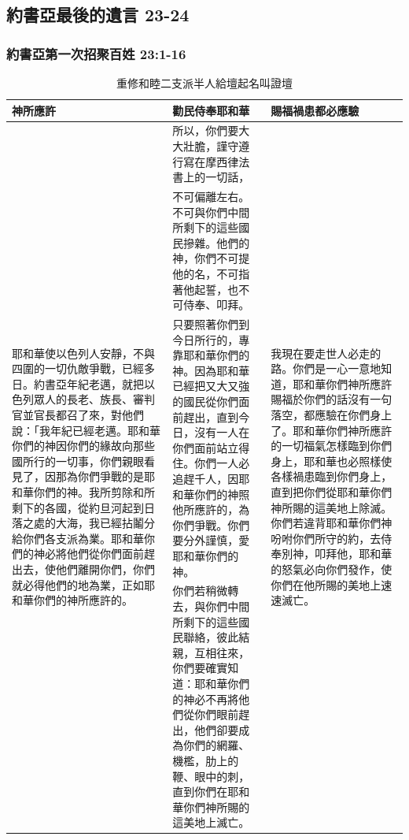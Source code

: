 \subsection{約書亞最後的遺言 23-24}
\subsubsection{約書亞第一次招聚百姓 23:1-16}
\begin{table}[H]
\centering
\begin{tabular}{p{}|p{7.75cm}|p{4.25cm}}\hline\hline
神所應許&勸民侍奉耶和華&賜福禍患都必應驗\\\hline
\multirow{4}{5.cm}{耶和華使以色列人安靜，不與四圍的一切仇敵爭戰，已經多日。約書亞年紀老邁，就把以色列眾人的長老、族長、審判官並官長都召了來，對他們說：「我年紀已經老邁。耶和華你們的神因你們的緣故向那些國所行的一切事，你們親眼看見了，因那為你們爭戰的是耶和華你們的神。我所剪除和所剩下的各國，從約旦河起到日落之處的大海，我已經拈鬮分給你們各支派為業。耶和華你們的神必將他們從你們面前趕出去，使他們離開你們，你們就必得他們的地為業，正如耶和華你們的神所應許的。}
&所以，你們要大大壯膽，謹守遵行寫在摩西律法書上的一切話，
&\multirow{4}{4.25cm}{我現在要走世人必走的路。你們是一心一意地知道，耶和華你們神所應許賜福於你們的話沒有一句落空，都應驗在你們身上了。耶和華你們神所應許的一切福氣怎樣臨到你們身上，耶和華也必照樣使各樣禍患臨到你們身上，直到把你們從耶和華你們神所賜的這美地上除滅。你們若違背耶和華你們神吩咐你們所守的約，去侍奉別神，叩拜他，耶和華的怒氣必向你們發作，使你們在他所賜的美地上速速滅亡。}\\\cline{2-2}
&不可偏離左右。不可與你們中間所剩下的這些國民摻雜。他們的神，你們不可提他的名，不可指著他起誓，也不可侍奉、叩拜。&\\\cline{2-2}
&只要照著你們到今日所行的，專靠耶和華你們的神。因為耶和華已經把又大又強的國民從你們面前趕出，直到今日，沒有一人在你們面前站立得住。你們一人必追趕千人，因耶和華你們的神照他所應許的，為你們爭戰。你們要分外謹慎，愛耶和華你們的神。&\\\cline{2-2}
&你們若稍微轉去，與你們中間所剩下的這些國民聯絡，彼此結親，互相往來，你們要確實知道：耶和華你們的神必不再將他們從你們眼前趕出，他們卻要成為你們的網羅、機檻，肋上的鞭、眼中的刺，直到你們在耶和華你們神所賜的這美地上滅亡。&\\\hline

 \end{tabular}
\caption{重修和睦二支派半人給壇起名叫證壇}
\end{table}



